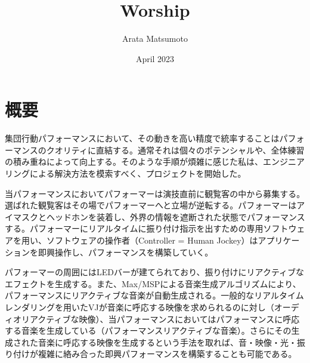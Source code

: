 \documentclass[a4paper]{article}
\title{Worship}
\author{Arata Matsumoto}
\date{April 2023}
\begin{document}
\maketitle
\section{概要}
集団行動パフォーマンスにおいて、その動きを高い精度で統率することはパフォーマンスのクオリティに直結する。通常それは個々のポテンシャルや、全体練習の積み重ねによって向上する。そのような手順が煩雑に感じた私は、エンジニアリングによる解決方法を模索すべく、プロジェクトを開始した。

当パフォーマンスにおいてパフォーマーは演技直前に観覧客の中から募集する。選ばれた観覧客はその場でパフォーマーへと立場が逆転する。パフォーマーはアイマスクとヘッドホンを装着し、外界の情報を遮断された状態でパフォーマンスする。パフォーマーにリアルタイムに振り付け指示を出すための専用ソフトウェアを用い、ソフトウェアの操作者（Controller = Human Jockey）はアプリケーションを即興操作し、パフォーマンスを構築していく。

パフォーマーの周囲にはLEDバーが建てられており、振り付けにリアクティブなエフェクトを生成する。また、Max/MSPによる音楽生成アルゴリズムにより、パフォーマンスにリアクティブな音楽が自動生成される。一般的なリアルタイムレンダリングを用いたVJが音楽に呼応する映像を求められるのに対し（オーディオリアクティブな映像）、当パフォーマンスにおいてはパフォーマンスに呼応する音楽を生成している（パフォーマンスリアクティブな音楽）。さらにその生成された音楽に呼応する映像を生成するという手法を取れば、音・映像・光・振り付けが複雑に絡み合った即興パフォーマンスを構築することも可能である。
\end{document}
